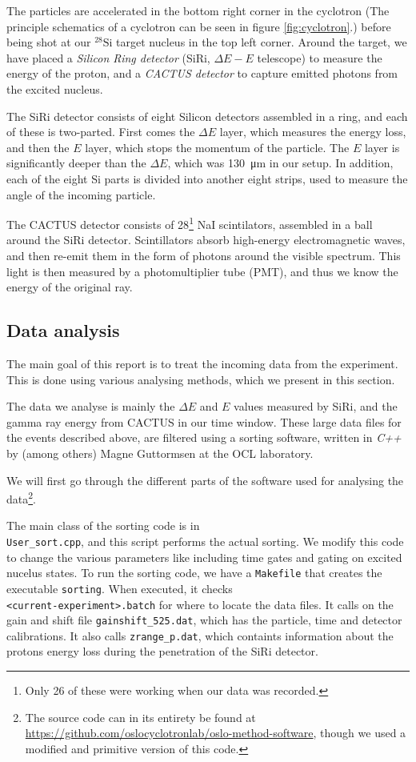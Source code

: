 \documentclass[a4paper,12pt]{article}
\begin{document}
The particles are accelerated in the bottom right corner in the
cyclotron 
(The principle schematics of a cyclotron can be seen 
in figure \ref{fig:cyclotron}.)
before being shot at our $^{28}\text{Si}$ target nucleus 
in the top left corner.
Around the target, we have placed a \emph{Silicon Ring detector} 
(SiRi, $\Delta E - E$ telescope)
to measure the energy of the proton, and a \emph{CACTUS detector} 
to capture emitted photons from the excited nucleus.

The SiRi detector consists of eight Silicon detectors
assembled in a ring, and each of these is two-parted.
First comes the $\Delta E$ layer, which measures the energy loss,
and then the $E$ layer, which stops the momentum of the particle.
The $E$ layer is significantly deeper than the $\Delta E$,
which was \SI{130}{\micro\meter} in our setup.
In addition, each of the eight Si parts is divided into another
eight strips, used to measure the angle of the incoming particle.

The CACTUS detector consists of 28\footnote{Only 26 of these were 
    working when our data was recorded.}
NaI scintilators, assembled in a ball around the SiRi detector.
Scintillators absorb high-energy electromagnetic waves,
and then re-emit them in the form of photons around the visible spectrum.
This light is then measured by a photomultiplier tube (PMT),
and thus we know the energy of the original ray.

\subsection{Data analysis}
The main goal of this report is to treat the incoming data
from the experiment. This is done using various analysing methods,
which we present in this section.

The data we analyse is mainly the $\Delta E$ and $E$ values measured
by SiRi, and the gamma ray energy from CACTUS in our time window.
These large data files for the events described above,
are filtered using a sorting software,
written in \textit{C++} by (among others) 
Magne Guttormsen at the OCL laboratory.

We will first go through the different parts of the software
used for analysing the data\footnote{The source code can in its entirety
be found at \url{https://github.com/oslocyclotronlab/oslo-method-software},
though we used a modified and primitive version of this code.}.

The main class of the sorting code is in \\
\verb+User_sort.cpp+,
and this script performs the actual sorting.
We modify this code to change the various parameters
like including time gates and gating on excited nucelus states.
To run the sorting code, we have a \verb+Makefile+
that creates the executable \verb+sorting+.
When executed, it checks\\
\verb+<current-experiment>.batch+
for where to locate the data files.
It calls on the gain and shift file \verb+gainshift_525.dat+,
which has the particle, time and detector calibrations.
It also calls \verb+zrange_p.dat+, which containts information
about the protons energy loss during the penetration of the SiRi detector.
\end{document}
